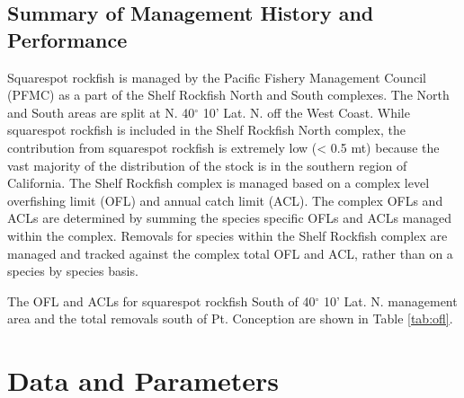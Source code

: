 \documentclass[11pt,
  english,
  a4paper,
]{article}
\begin{document}
\leavevmode\tagmcend\tagstructend\par


\hypertarget{summary-of-management-history-and-performance}{%
\subsection{Summary of Management History and Performance}\label{summary-of-management-history-and-performance}}

\leavevmode\tagmcend\tagstructend


Squarespot rockfish is managed by the Pacific Fishery Management Council (PFMC) as a part of the Shelf Rockfish North and South complexes. The North and South areas are split at N. 40{\(^\circ\)\leavevmode\tagmcend\tagstructend} 10' Lat. N. off the West Coast. While squarespot rockfish is included in the Shelf Rockfish North complex, the contribution from squarespot rockfish is extremely low (\textless{} 0.5 mt) because the vast majority of the distribution of the stock is in the southern region of California. The Shelf Rockfish complex is managed based on a complex level overfishing limit (OFL) and annual catch limit (ACL). The complex OFLs and ACLs are determined by summing the species specific OFLs and ACLs managed within the complex. Removals for species within the Shelf Rockfish complex are managed and tracked against the complex total OFL and ACL, rather than on a species by species basis.

\leavevmode\tagmcend\tagstructend\par


The OFL and ACLs for squarespot rockfish South of 40{\(^\circ\)\leavevmode\tagmcend\tagstructend} 10' Lat. N. management area and the total removals south of Pt. Conception are shown in Table \ref{tab:ofl}.

\leavevmode\tagmcend\tagstructend\par


\hypertarget{data-and-parameters}{%
\section{Data and Parameters}\label{data-and-parameters}}
\end{document}
